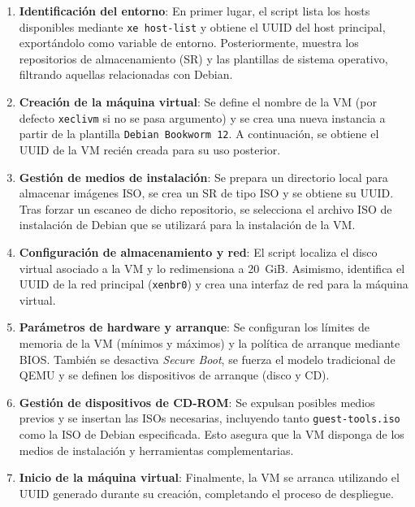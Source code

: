 \begin{enumerate}
    \item \textbf{Identificación del entorno}:  
    En primer lugar, el script lista los hosts disponibles mediante \texttt{xe host-list} y obtiene el UUID del host principal, exportándolo como variable de entorno. Posteriormente, muestra los repositorios de almacenamiento (SR) y las plantillas de sistema operativo, filtrando aquellas relacionadas con Debian.

    \item \textbf{Creación de la máquina virtual}:  
    Se define el nombre de la VM (por defecto \texttt{xeclivm} si no se pasa argumento) y se crea una nueva instancia a partir de la plantilla \texttt{Debian Bookworm 12}. A continuación, se obtiene el UUID de la VM recién creada para su uso posterior.

    \item \textbf{Gestión de medios de instalación}:  
    Se prepara un directorio local para almacenar imágenes ISO, se crea un SR de tipo ISO y se obtiene su UUID. Tras forzar un escaneo de dicho repositorio, se selecciona el archivo ISO de instalación de Debian que se utilizará para la instalación de la VM.

    \item \textbf{Configuración de almacenamiento y red}:  
    El script localiza el disco virtual asociado a la VM y lo redimensiona a 20~GiB. Asimismo, identifica el UUID de la red principal (\texttt{xenbr0}) y crea una interfaz de red para la máquina virtual.

    \item \textbf{Parámetros de hardware y arranque}:  
    Se configuran los límites de memoria de la VM (mínimos y máximos) y la política de arranque mediante BIOS. También se desactiva \textit{Secure Boot}, se fuerza el modelo tradicional de QEMU y se definen los dispositivos de arranque (disco y CD).  

    \item \textbf{Gestión de dispositivos de CD-ROM}:  
    Se expulsan posibles medios previos y se insertan las ISOs necesarias, incluyendo tanto \texttt{guest-tools.iso} como la ISO de Debian especificada. Esto asegura que la VM disponga de los medios de instalación y herramientas complementarias.

    \item \textbf{Inicio de la máquina virtual}:  
    Finalmente, la VM se arranca utilizando el UUID generado durante su creación, completando el proceso de despliegue.

\end{enumerate}

